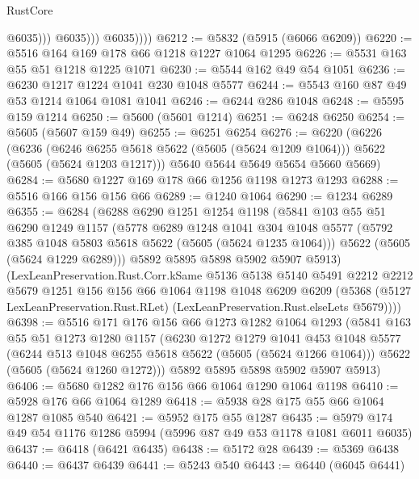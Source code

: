\begin{lexlean}{RustCore}
\begin{coremodule}
                        @6035)))
                  @6035)))
            @6035))))
@6212 := @5832 (@5915 (@6066 @6209))
@6220 := @5516 @164 @169 @178 @66 @1218 @1227 @1064 @1295
@6226 := @5531 @163 @55 @51 @1218 @1225 @1071
@6230 := @5544 @162 @49 @54 @1051
@6236 := @6230 @1217 @1224 @1041 @230 @1048 @5577
@6244 := @5543 @160 @87 @49 @53 @1214 @1064 @1081 @1041
@6246 := @6244 @286 @1048
@6248 := @5595 @159 @1214
@6250 := @5600 (@5601 @1214)
@6251 := @6248 @6250
@6254 := @5605 (@5607 @159 @49)
@6255 := @6251 @6254
@6276 := @6220
    (@6226
      (@6236
        (@6246 @6255 @5618 @5622 (@5605 (@5624 @1209 @1064)))
        @5622
        (@5605 (@5624 @1203 @1217)))
      @5640
      @5644
      @5649
      @5654
      @5660
      @5669)
@6284 := @5680 @1227 @169 @178 @66 @1256 @1198 @1273 @1293
@6288 := @5516 @166 @156 @156 @66
@6289 := @1240 @1064
@6290 := @1234 @6289
@6355 := @6284
    (@6288
      @6290
      @1251
      @1254
      @1198
      (@5841
        @103
        @55
        @51
        @6290
        @1249
        @1157
        (@5778
          @6289
          @1248
          @1041
          @304
          @1048
          @5577
          (@5792 @385 @1048 @5803 @5618 @5622 (@5605 (@5624 @1235 @1064)))
          @5622
          (@5605 (@5624 @1229 @6289)))
        @5892
        @5895
        @5898
        @5902
        @5907
        @5913)
      (LexLeanPreservation.Rust.Corr.kSame
        @5136
        @5138
        @5140
        @5491
        @2212
        @2212
        @5679
        @1251
        @156
        @156
        @66
        @1064
        @1198
        @1048
        @6209
        @6209
        (@5368 (@5127 LexLeanPreservation.Rust.RLet) (LexLeanPreservation.Rust.elseLets @5679))))
@6398 := @5516
    @171
    @176
    @156
    @66
    @1273
    @1282
    @1064
    @1293
    (@5841
      @163
      @55
      @51
      @1273
      @1280
      @1157
      (@6230
        @1272
        @1279
        @1041
        @453
        @1048
        @5577
        (@6244 @513 @1048 @6255 @5618 @5622 (@5605 (@5624 @1266 @1064)))
        @5622
        (@5605 (@5624 @1260 @1272)))
      @5892
      @5895
      @5898
      @5902
      @5907
      @5913)
@6406 := @5680 @1282 @176 @156 @66 @1064 @1290 @1064 @1198
@6410 := @5928 @176 @66 @1064 @1289
@6418 := @5938 @28 @175 @55 @66 @1064 @1287 @1085 @540
@6421 := @5952 @175 @55 @1287
@6435 := @5979 @174 @49 @54 @1176 @1286 @5994 (@5996 @87 @49 @53 @1178 @1081 @6011 @6035)
@6437 := @6418 (@6421 @6435)
@6438 := @5172 @28
@6439 := @5369 @6438
@6440 := @6437 @6439
@6441 := @5243 @540
@6443 := @6440 (@6045 @6441)

\end{coremodule}
\end{lexlean}
